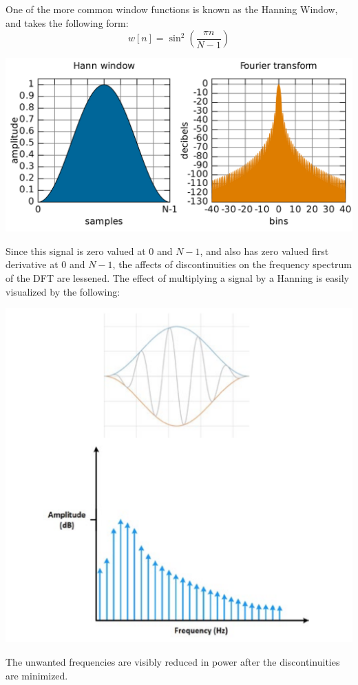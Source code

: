 \documentclass[a4paper]{article}
\numberwithin{equation}{section}
\begin{document}
One of the more common window functions is known as the Hanning Window, and takes the following form:
\begin{equation}
w[n]=\sin^{2}{(\frac{\pi n}{N-1})}
\end{equation}
\begin{center}
\includegraphics[scale=0.15]{HannWindow.png}
\end{center}
Since this signal is zero valued at 0 and $N-1$, and also has zero valued first derivative at 0 and $N-1$, the affects of discontinuities on the frequency spectrum of the DFT are lessened. The effect of multiplying a signal by a Hanning is easily visualized by the following:
\begin{center}
\includegraphics[scale=0.55]{HannEffect.png}
\end{center}
The unwanted frequencies are visibly reduced in power after the discontinuities are minimized. 
\end{document}
